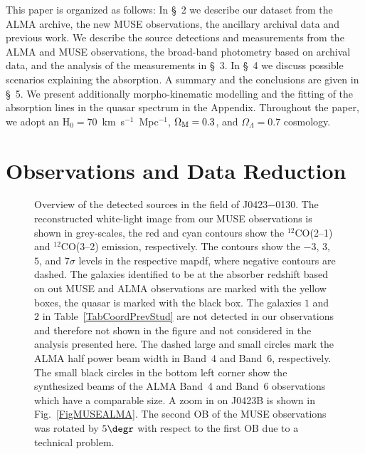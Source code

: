 \documentclass[a4paper,fleqn,usenatbib]{mnras}
\begin{document}
This paper is organized as follows: In \S~2 we describe our dataset from the ALMA archive, the new MUSE observations, the ancillary archival data and previous work. We describe the source detections and measurements from the ALMA and MUSE observations, the broad-band photometry based on archival data, and the analysis of the measurements in \S~3. In \S~4 we discuss possible scenarios explaining the absorption. A summary and the conclusions are given in \S~5. We present additionally morpho-kinematic modelling and the fitting of the absorption lines in the quasar spectrum in the Appendix. Throughout the paper, we adopt an H$_0=70$~km~s$^{-1}$~Mpc$^{-1}$, $\Omega_{\rm M}=0.3$, and $\Omega_{\Lambda}=0.7$ cosmology.

\section{Observations and Data Reduction}

\begin{figure*}
\caption{Overview of the detected sources in the field of J0423$-$0130. The reconstructed white-light image from our MUSE observations is shown in grey-scales, the red and cyan contours show the $^{12}$CO(2--1) and $^{12}$CO(3--2) emission, respectively. The contours show the $-3$, $3$, $5$, and $7\sigma$ levels in the respective mapdf, where negative contours are dashed. The galaxies identified to be at the absorber redshift based on out MUSE and ALMA observations are marked with the yellow boxes, the quasar is marked with the black box. The galaxies $1$ and $2$ in Table~\ref{TabCoordPrevStud} are not detected in our observations and therefore not shown in the figure and not considered in the analysis presented here. The dashed large and small circles mark the ALMA half power beam width in Band~4 and Band~6, respectively. The small black circles in the bottom left corner show the synthesized beams of the ALMA Band~4 and Band~6 observations which have a comparable size. A zoom in on J0423B is shown in Fig.~\ref{FigMUSEALMA}. The second OB of the MUSE observations was rotated by $5\degr$ with respect to the first OB due to a technical problem.}
\label{Fig.Overview1}
\end{figure*}
\end{document}
